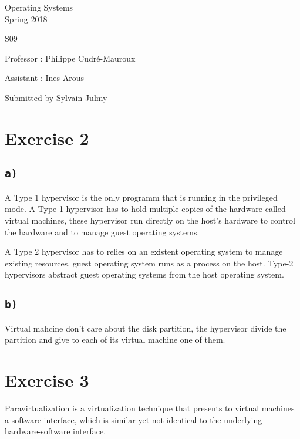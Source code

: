 \documentclass[a4paper,11pt]{report}
\author{Sylvain Julmy}
\date{\today}
\begin{document}
\begin{center}
  \Large{
    Operating Systems\\
    Spring 2018
  }
  
  \noindent\makebox[\linewidth]{\rule{\linewidth}{0.4pt}}
  S09
  \noindent\makebox[\linewidth]{\rule{\linewidth}{0.4pt}}
  \begin{flushleft}
    Professor : Philippe Cudré-Mauroux

    Assistant : Ines Arous
  \end{flushleft}
  
  \noindent\makebox[\linewidth]{\rule{\linewidth}{0.4pt}}

  Submitted by Sylvain Julmy
  
  \noindent\makebox[\linewidth]{\rule{\textwidth}{1pt}}
\end{center}

\section*{Exercise 2}

\subsection*{\texttt{a)}}

A Type 1 hypervisor is the only programm that is running in the privileged mode.
A Type 1 hypervisor has to hold multiple copies of the hardware called virtual
machines, these hypervisor  run directly on the host's hardware to control the
hardware and to manage guest operating systems.

A Type 2 hypervisor has to relies on an existent operating system to manage
existing resources.  guest operating system runs as a process on the host.
Type-2 hypervisors abstract guest operating systems from the host operating
system.

\subsection*{\texttt{b)}}

Virtual mahcine don't care about the disk partition, the hypervisor divide the
partition and give to each of its virtual machine one of them.

\section*{Exercise 3}

 Paravirtualization is a virtualization technique that presents to virtual
 machines a software interface, which is similar yet not identical to the
 underlying hardware-software interface.
\end{document}

